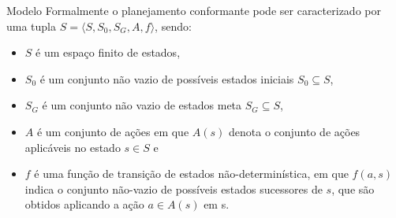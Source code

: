 % 
% 


\begin{frame}{Modelo}
Formalmente o planejamento conformante pode ser caracterizado por uma tupla 
$S=\langle S, S_0, S_G, A, f \rangle$, sendo:
\begin{itemize}
\item $S$ é um espaço finito de estados,
\item $S_0$ é um conjunto não vazio de possíveis estados iniciais $S_0\subseteq 
S$,
\item $S_G$ é um conjunto não vazio de estados meta $S_G \subseteq S$,
\item $A$ é um conjunto de ações em que $A(s)$ denota o conjunto de ações 
aplicáveis no estado $s \in S$ e
\item $f$ é uma função de transição de estados não-determinística, em que 
$f(a,s)$ indica o conjunto não-vazio de possíveis estados sucessores de $s$, que 
são obtidos aplicando a ação $a \in A(s)$ em s.
\end{itemize}
\end{frame}



